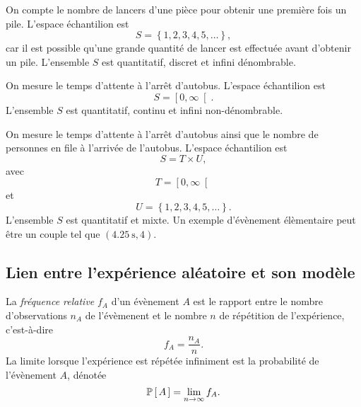 \documentclass[11pt]{article}
\renewcommand\P[1]{%
	\ensuremath{%
		\mathbb{P}\left[\,#1\,\right]%
	}%
}%
\begin{document}
\begin{exemple}
	On compte le nombre de lancers d'une pièce pour obtenir une première fois
	un pile. L'espace échantilion est
	\begin{equation*}
		S=\left\{1,2,3,4,5,\dots\right\},
	\end{equation*}
	car il est possible qu'une grande quantité de lancer est effectuée avant
	d'obtenir un pile. L'ensemble $S$ est quantitatif, discret et
	infini dénombrable.
\end{exemple}

\pagebreak
\begin{exemple}
	On mesure le temps d'attente à l'arrêt d'autobus. L'espace échantilion est
	\begin{equation*}
		S=\left[0,\infty\right[.
	\end{equation*}
	L'ensemble $S$ est quantitatif, continu et infini non-dénombrable.
\end{exemple}

\begin{exemple}
	On mesure le temps d'attente à l'arrêt d'autobus ainsi que le nombre de
	personnes en file à l'arrivée de l'autobus. L'espace échantilion est
	\begin{equation*}
		S=T\times U,
	\end{equation*}
	avec
	\begin{equation*}
		T=\left[0,\infty\right[
	\end{equation*}
	et
	\begin{equation*}
		U=\left\{1,2,3,4,5,\dots\right\}.
	\end{equation*}
	L'ensemble $S$ est quantitatif et mixte. Un exemple d'évènement élèmentaire
	peut être un couple tel que $\left(\SI{4.25}{\second}, 4\right)$.
\end{exemple}

\subsection{Lien entre l'expérience aléatoire et son modèle}
\begin{definition}
	La \textit{fréquence relative} $f_A$ d'un évènement $A$ est le rapport
	entre le nombre d'observations $n_A$ de l'évèmenent et le nombre $n$ de
	répétition de l'expérience, c'est-à-dire
	\begin{equation*}
		f_A=\frac{n_A}{n}.
	\end{equation*}
	La limite lorsque l'expérience est répétée infiniment est la probabilité de
	l'évènement $A$, dénotée
	\begin{equation*}
		\P{A}=\lim_{n\rightarrow\infty}f_A.
	\end{equation*}
\end{definition}
\end{document}

